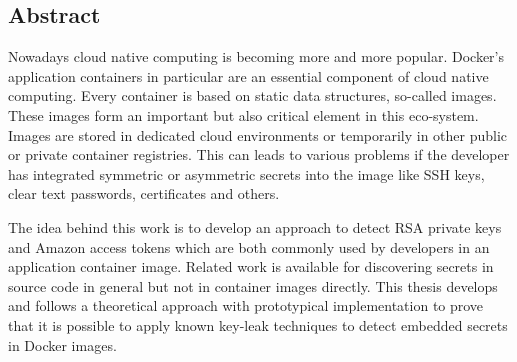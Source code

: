 
\begin{otherlanguage}{american}
\chapter*{Abstract}
Nowadays cloud native computing is becoming more and more popular. 
Docker's application containers in particular are an essential component of cloud native computing. 
Every container is based on static data structures, so-called images. 
These images form an important but also critical element in this eco-system.
Images are stored in dedicated cloud environments or temporarily in other public or private container registries. 
This can leads to various problems if the developer has integrated symmetric or asymmetric secrets into the image like SSH keys, clear text passwords, certificates and others.

The idea behind this work is to develop an approach to detect RSA private keys and Amazon access tokens which are both commonly used by developers in an application container image. Related work is available for discovering secrets in source code in general but not in container images directly. This thesis develops and follows a theoretical approach with prototypical implementation to prove that it is possible to apply known key-leak techniques to detect embedded secrets in Docker images.
\end{otherlanguage}